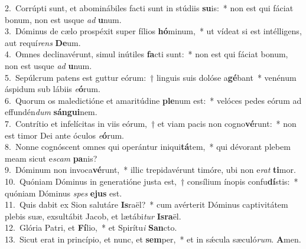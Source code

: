 {2.~}Corrúpti sunt, et abominábiles facti sunt in stúdiis \textbf{su}is:~* non est qui fáciat bonum, non est usque \textit{ad} \textbf{u}num.\\
{3.~}Dóminus de cælo prospéxit super fílios \textbf{hó}minum,~* ut vídeat si est intélligens, aut requí\textit{rens} \textbf{De}um.\\
{4.~}Omnes declinavérunt, simul inútiles \textbf{fa}cti sunt:~* non est qui fáciat bonum, non est usque \textit{ad} \textbf{u}num.\\
{5.~}Sepúlcrum patens est guttur eórum:~† linguis suis dolóse a\textbf{gé}bant~* venénum áspidum sub lábiis \textit{e}\textbf{ó}rum.\\
{6.~}Quorum os maledictióne et amaritúdine \textbf{ple}num est:~* velóces pedes eórum ad effundén\textit{dum} \textbf{sán}\textbf{gui}nem.\\
{7.~}Contrítio et infelícitas in viis eórum,~† et viam pacis non cogno\textbf{vé}runt:~* non est timor Dei ante óculos \textit{e}\textbf{ó}rum.\\
{8.~}Nonne cognóscent omnes qui operántur iniqui\textbf{tá}tem,~* qui dévorant plebem meam sicut e\textit{scam} \textbf{pa}nis?\\
{9.~}Dóminum non invoca\textbf{vé}runt,~* illic trepidavérunt timóre, ubi non e\textit{rat} \textbf{ti}mor.\\
{10.~}Quóniam Dóminus in generatióne justa est,~† consílium ínopis confu\textbf{dí}stis:~* quóniam Dóminus \textit{spes} \textbf{e}\textbf{jus} est.\\
{11.~}Quis dabit ex Sion salutáre \textbf{Is}raël?~* cum avérterit Dóminus captivitátem plebis suæ, exsultábit Jacob, et lætábi\textit{tur} \textbf{Is}\textbf{ra}ël.\\
{12.~}Glória Patri, et \textbf{Fí}lio,~* et Spirítu\textit{i} \textbf{San}cto.\\
{13.~}Sicut erat in princípio, et nunc, et \textbf{sem}per,~* et in sǽcula sæculó\textit{rum}. \textbf{A}men.\\
